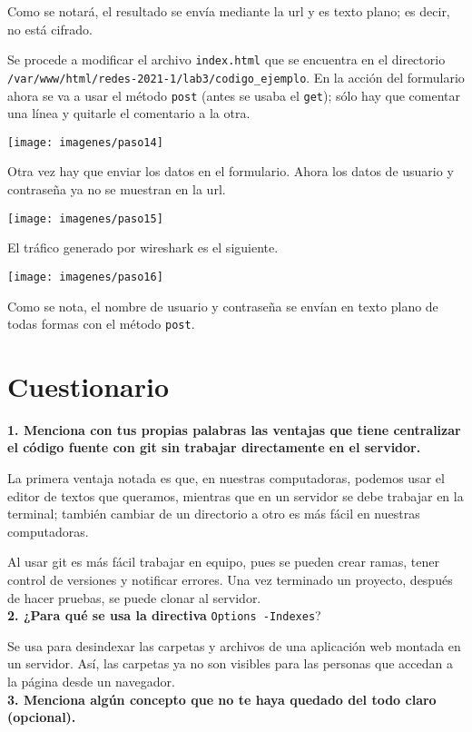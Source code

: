 \documentclass{article}
\begin{document}
Como se notará, el resultado se envía mediante la url y es texto plano; es decir, no está cifrado.

Se procede a modificar el archivo \texttt{index.html} que se encuentra en el directorio \texttt{/var/www/html/redes-2021-1/lab3/codigo\_ejemplo}. En la acción del formulario ahora se va a usar el método \texttt{post} (antes se usaba el \texttt{get}); sólo hay que comentar una línea y quitarle el comentario a la otra.

\texttt{[image: imagenes/paso14]}

Otra vez hay que enviar los datos en el formulario. Ahora los datos de usuario y contraseña ya no se muestran en la url.

\texttt{[image: imagenes/paso15]}

El tráfico generado por wireshark es el siguiente.

\texttt{[image: imagenes/paso16]}

Como se nota, el nombre de usuario y contraseña se envían en texto plano de todas formas con el método \texttt{post}.

\section{Cuestionario}

\textbf{1. Menciona con tus propias palabras las ventajas que tiene centralizar el código fuente con git sin trabajar directamente en el servidor.}

La primera ventaja notada es que, en nuestras computadoras, podemos usar el editor de textos que queramos, mientras que en un servidor se debe trabajar en la terminal; también cambiar de un directorio a otro es más fácil en nuestras computadoras.

Al usar git es más fácil trabajar en equipo, pues se pueden crear ramas, tener control de versiones y notificar errores. Una vez terminado un proyecto, después de hacer pruebas, se puede clonar al servidor.\\

\textbf{2. ¿Para qué se usa la directiva} \texttt{Options -Indexes}?

Se usa para desindexar las carpetas y archivos de una aplicación web montada en un servidor. Así, las carpetas ya no son visibles para las personas que accedan a la página desde un navegador.\\

\textbf{3. Menciona algún concepto que no te haya quedado del todo claro (opcional).}
\end{document}
